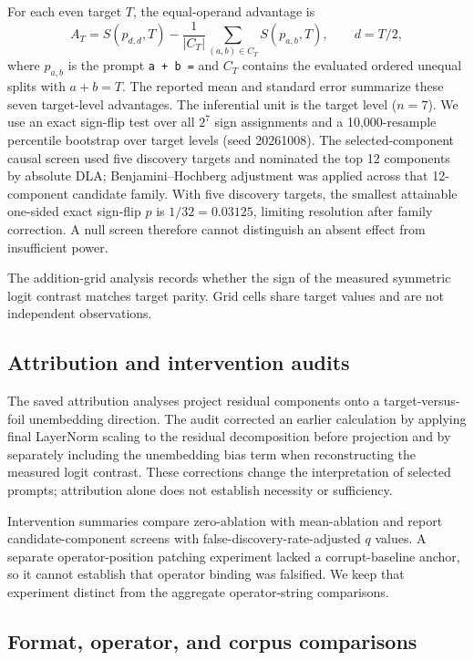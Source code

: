 \documentclass[11pt]{article}
\begin{document}
For each even target $T$, the equal-operand advantage is
\begin{equation}
A_T=S(p_{d,d},T)-\frac{1}{|C_T|}\sum_{(a,b)\in C_T}S(p_{a,b},T),\qquad d=T/2,
\label{eq:adv}
\end{equation}
where $p_{a,b}$ is the prompt \texttt{a + b =} and $C_T$ contains the evaluated ordered unequal splits with $a+b=T$. The reported mean and standard error summarize these seven target-level advantages. The inferential unit is the target level ($n=7$). We use an exact sign-flip test over all $2^7$ sign assignments and a 10,000-resample percentile bootstrap over target levels (seed 20261008). The selected-component causal screen used five discovery targets and nominated the top 12 components by absolute DLA; Benjamini--Hochberg adjustment was applied across that 12-component candidate family. With five discovery targets, the smallest attainable one-sided exact sign-flip $p$ is $1/32=0.03125$, limiting resolution after family correction. A null screen therefore cannot distinguish an absent effect from insufficient power.

The addition-grid analysis records whether the sign of the measured symmetric logit contrast matches target parity. Grid cells share target values and are not independent observations.

\subsection{Attribution and intervention audits}

The saved attribution analyses project residual components onto a target-versus-foil unembedding direction. The audit corrected an earlier calculation by applying final LayerNorm scaling to the residual decomposition before projection and by separately including the unembedding bias term when reconstructing the measured logit contrast. These corrections change the interpretation of selected prompts; attribution alone does not establish necessity or sufficiency.

Intervention summaries compare zero-ablation with mean-ablation and report candidate-component screens with false-discovery-rate-adjusted $q$ values. A separate operator-position patching experiment lacked a corrupt-baseline anchor, so it cannot establish that operator binding was falsified. We keep that experiment distinct from the aggregate operator-string comparisons.

\subsection{Format, operator, and corpus comparisons}
\end{document}
